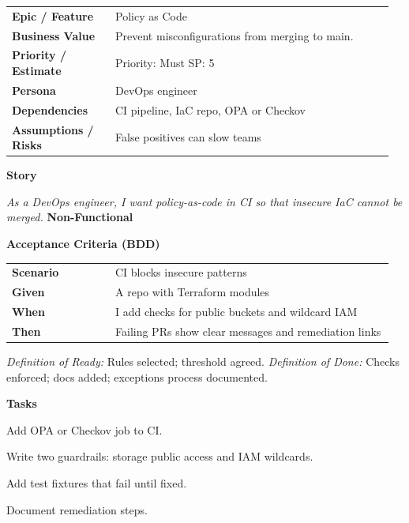 \documentclass[11pt,letterpaper]{article}
\makeatletter
\newenvironment{kvtable}{%
  \begin{tabular}{@{}>{\bfseries\arraybackslash}p{0.26\linewidth} p{0.70\linewidth}@{}}
}{\end{tabular}}
\newenvironment{bdd}{%
  \begin{tabular}{@{}>{\bfseries\arraybackslash}p{0.26\linewidth} p{0.70\linewidth}@{}}
}{\end{tabular}}
\newcommand{\DoRDoD}[2]{%
  \vspace{0.35em}
  {\footnotesize\color{Muted}%
    \textit{Definition of Ready:} #1 \; \textbullet\;
    \textit{Definition of Done:} #2%
  }%
}
\newenvironment{storycard}[2]{%
  \begin{tcolorbox}[cloudcard, title={#1 --- #2}]%
}{\end{tcolorbox}}
\newcommand{\sectionlabel}[1]{\vspace{0.35em}\textbf{#1}\par}
\makeatother
\begin{document}
\begin{storycard}{CCS-8}{Ch. 8 — Cloud Security Risk Management}
\begin{kvtable}
Epic / Feature & Policy as Code\\
Business Value & Prevent misconfigurations from merging to main.\\
Priority / Estimate & Priority: Must \quad SP: 5\\
Persona & DevOps engineer\\
Dependencies & CI pipeline, IaC repo, OPA or Checkov\\
Assumptions / Risks & False positives can slow teams\\
\end{kvtable}
\sectionlabel{Story}
\textit{As a DevOps engineer, I want policy-as-code in CI so that insecure IaC cannot be merged.}
\sectionlabel{Non-Functional}\;
\sectionlabel{Acceptance Criteria (BDD)}
\begin{bdd}
Scenario & CI blocks insecure patterns\\
Given & A repo with Terraform modules\\
When & I add checks for public buckets and wildcard IAM\\
Then & Failing PRs show clear messages and remediation links\\
\end{bdd}
\DoRDoD{Rules selected; threshold agreed.}{Checks enforced; docs added; exceptions process documented.}
\sectionlabel{Tasks}
\begin{checklist}
\item Add OPA or Checkov job to CI.
\item Write two guardrails: storage public access and IAM wildcards.
\item Add test fixtures that fail until fixed.
\item Document remediation steps.
\end{checklist}
\end{storycard}
\end{document}
